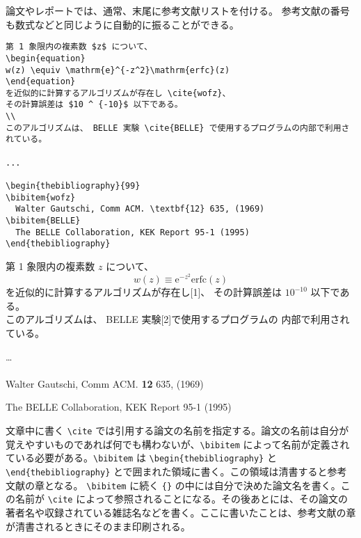 論文やレポートでは、通常、末尾に参考文献リストを付ける。
参考文献の番号も数式などと同じように自動的に振ることができる。
\begin{reidai}
\begin{verbatim}
第 1 象限内の複素数 $z$ について、
\begin{equation}
w(z) \equiv \mathrm{e}^{-z^2}\mathrm{erfc}(z)
\end{equation}
を近似的に計算するアルゴリズムが存在し \cite{wofz}、
その計算誤差は $10 ^ {-10}$ 以下である。
\\
このアルゴリズムは、 BELLE 実験 \cite{BELLE} で使用するプログラムの内部で利用されている。

...

\begin{thebibliography}{99}
\bibitem{wofz}
  Walter Gautschi, Comm ACM. \textbf{12} 635, (1969) 
\bibitem{BELLE}
  The BELLE Collaboration, KEK Report 95-1 (1995)
\end{thebibliography}
\end{verbatim}
\end{reidai}
\setcounter{equation}{0}
\vspace*{-1.5em}
\begin{kekka}
  \hspace*{0.3cm}第 1 象限内の複素数 $z$ について、
  \begin{equation}
    w(z) \equiv \mathrm{e}^{-z^2}\mathrm{erfc}(z)
  \end{equation}
  を近似的に計算するアルゴリズムが存在し[1]、
  その計算誤差は $10 ^ {-10}$ 以下である。
  \\
  このアルゴリズムは、 BELLE 実験[2]で使用するプログラムの
  内部で利用されている。

  \dots \\[.2em]

   \\[.2em]

  \noindent [1] Walter Gautschi, Comm ACM. \textbf{12} 635, (1969)

  \noindent [2] The BELLE Collaboration, KEK Report 95-1 (1995)
\end{kekka} \noindent
文章中に書く \verb|\cite| では引用する論文の名前を指定する。論文の名前は自分が覚えやすいものであれば何でも構わないが、\verb|\bibitem| によって名前が定義されている必要がある。\verb|\bibitem| は \verb|\begin{thebibliography}| と \verb|\end{thebibliography}| とで囲まれた領域に書く。この領域は清書すると参考文献の章となる。
\verb|\bibitem| に続く {\tt \{\}} の中には自分で決めた論文名を書く。この名前が \verb|\cite| によって参照されることになる。その後あとには、その論文の著者名や収録されている雑誌名などを書く。ここに書いたことは、参考文献の章が清書されるときにそのまま印刷される。

